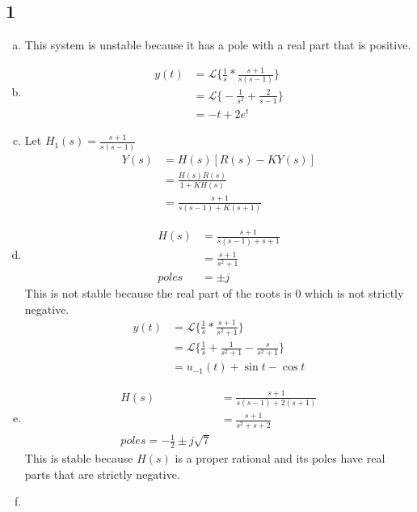 \documentclass[12pt]{article}
\begin{document}
\subsection*{1}
\begin{enumerate}[a.]
    \item This system is unstable because it has a pole with a real part that is positive.
    \item
    \begin{align*}
        y(t) & = \mathcal{L} \bigg \{ \frac{1}{s} * \frac{s+1}{s(s-1)} \bigg\}\\
        &= \mathcal{L} \bigg \{  -\frac{1}{s^2} + \frac{2}{s-1}  \bigg \}\\
        &= -t + 2e^t
    \end{align*}
    \item Let $H_1(s) = \frac{s+1}{s(s-1)}$
    \begin{align*}
        Y(s) &= H(s)[R(s) - KY(s)]\\
        &= \frac{H(s)R(s)}{1+KH(s)}\\
        &= \frac{s+1}{s(s-1) + K(s+1)}
    \end{align*}
    \item
    \begin{align*}
        H(s) & = \frac{s+1}{s(s-1) + s+1}\\
        &= \frac{s+1}{s^2+1}\\
        poles &= \pm j
    \end{align*}
    This is not stable because the real part of the roots is 0 which is not strictly negative.
    \begin{align*}
        y(t)&=\mathcal{L} \bigg\{ \frac{1}{s} * \frac{s+1}{s^2+1} \bigg\}\\
        &= \mathcal{L} \bigg\{ \frac{1}{s} + \frac{1}{s^2+1} - \frac{s}{s^2+1}\bigg\}\\
        &= u_{-1}(t) + \sin t - \cos t
    \end{align*}
    \item
    \begin{align*}
        H(s) &= \frac{s+1}{s(s-1) + 2(s+1)}\\
        &= \frac{s+1}{s^2 + s + 2}\\
        poles = -\frac{1}{2} \pm j\sqrt{7}
    \end{align*}
        This is stable because $H(s)$ is a proper rational and its poles have real parts that are strictly negative.
    \item
    \begin{align*}

\end{align*}
\end{enumerate}
\end{document}
